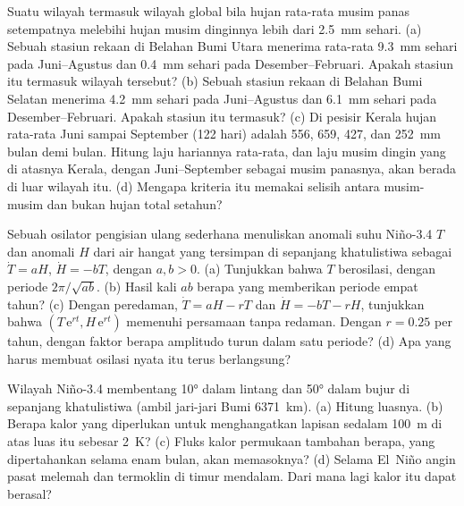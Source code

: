 \begin{exercise}[$\star\star$]\label{exo:b2:climate-variability:9}
Suatu wilayah termasuk wilayah  global bila hujan rata-rata musim panas setempatnya melebihi hujan
musim dinginnya lebih dari \qty{2.5}{mm} sehari. (a) Sebuah stasiun rekaan di Belahan Bumi
Utara menerima rata-rata \qty{9.3}{mm} sehari pada Juni--Agustus dan \qty{0.4}{mm} sehari pada
Desember--Februari. Apakah stasiun itu termasuk wilayah tersebut? (b) Sebuah stasiun rekaan di Belahan Bumi Selatan
menerima \qty{4.2}{mm} sehari pada Juni--Agustus dan \qty{6.1}{mm} sehari pada Desember--Februari. Apakah
stasiun itu termasuk? (c) Di pesisir Kerala hujan rata-rata Juni sampai September (122 hari) adalah 556, 659, 427, dan
\qty{252}{mm} bulan demi bulan. Hitung laju hariannya rata-rata, dan laju musim dingin yang di atasnya Kerala,
dengan Juni--September sebagai musim panasnya, akan berada di luar wilayah itu. (d) Mengapa kriteria itu
memakai selisih antara musim-musim dan bukan hujan total setahun?
\end{exercise}

\begin{exercise}[$\star\star\star$]\label{exo:b2:climate-variability:10}
Sebuah osilator pengisian ulang sederhana menuliskan anomali suhu Niño-3.4 $T$ dan anomali $H$ dari
air hangat yang tersimpan di sepanjang khatulistiwa sebagai $\dot T = aH$, $\dot H = -bT$, dengan $a, b > 0$. (a) Tunjukkan
bahwa $T$ berosilasi, dengan periode $2\pi/\sqrt{ab}$. (b) Hasil kali $ab$ berapa yang memberikan periode
empat tahun? (c) Dengan peredaman, $\dot T = aH - rT$ dan $\dot H = -bT - rH$, tunjukkan bahwa
$(T\,\mathrm{e}^{rt}, H\,\mathrm{e}^{rt})$ memenuhi persamaan tanpa redaman. Dengan $r = 0.25$ per
tahun, dengan faktor berapa amplitudo turun dalam satu periode? (d) Apa yang harus membuat osilasi
nyata itu terus berlangsung?
\end{exercise}

\begin{exercise}[$\star\star\star$]\label{exo:b2:climate-variability:11}
Wilayah Niño-3.4 membentang \ang{10} dalam lintang dan \ang{50} dalam bujur di sepanjang khatulistiwa
(ambil jari-jari Bumi \qty{6371}{km}). (a) Hitung luasnya. (b) Berapa kalor yang diperlukan untuk
menghangatkan lapisan sedalam \qty{100}{m} di atas luas itu sebesar \qty{2}{K}? (c) Fluks kalor permukaan tambahan berapa,
yang dipertahankan selama enam bulan, akan memasoknya? (d) Selama El~Niño angin pasat melemah dan
termoklin di timur mendalam. Dari mana lagi kalor itu dapat berasal?
\end{exercise}

